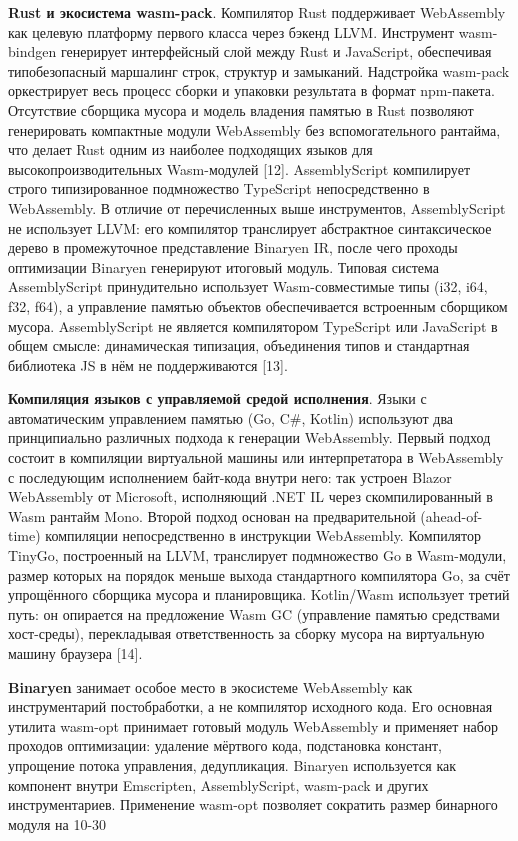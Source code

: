 \documentclass[12pt, oneside]{book}
\begin{document}
    \quad \textbf {Rust и экосистема wasm-pack}. Компилятор Rust поддерживает WebAssembly как целевую платформу первого класса через бэкенд LLVM. Инструмент wasm-bindgen генерирует интерфейсный слой между Rust и JavaScript, обеспечивая типобезопасный маршалинг строк, структур и замыканий. Надстройка wasm-pack оркестрирует весь процесс сборки и упаковки результата в формат npm-пакета. Отсутствие сборщика мусора и модель владения памятью в Rust позволяют генерировать компактные модули WebAssembly без вспомогательного рантайма, что делает Rust одним из наиболее подходящих языков для высокопроизводительных Wasm-модулей [12].
    AssemblyScript компилирует строго типизированное подмножество TypeScript непосредственно в WebAssembly. В отличие от перечисленных выше инструментов, AssemblyScript не использует LLVM: его компилятор транслирует абстрактное синтаксическое дерево в промежуточное представление Binaryen IR, после чего проходы оптимизации Binaryen генерируют итоговый модуль. Типовая система AssemblyScript принудительно использует Wasm-совместимые типы (i32, i64, f32, f64), а управление памятью объектов обеспечивается встроенным сборщиком мусора. AssemblyScript не является компилятором TypeScript или JavaScript в общем смысле: динамическая типизация, объединения типов и стандартная библиотека JS в нём не поддерживаются [13].
    
    \quad \textbf{Компиляция языков с управляемой средой исполнения}. Языки с автоматическим управлением памятью (Go, C\#, Kotlin) используют два принципиально различных подхода к генерации WebAssembly. Первый подход состоит в компиляции виртуальной машины или интерпретатора в WebAssembly с последующим исполнением байт-кода внутри него: так устроен Blazor WebAssembly от Microsoft, исполняющий .NET IL через скомпилированный в Wasm рантайм Mono. Второй подход основан на предварительной (ahead-of-time) компиляции непосредственно в инструкции WebAssembly. Компилятор TinyGo, построенный на LLVM, транслирует подмножество Go в Wasm-модули, размер которых на порядок меньше выхода стандартного компилятора Go, за счёт упрощённого сборщика мусора и планировщика. Kotlin/Wasm использует третий путь: он опирается на предложение Wasm GC (управление памятью средствами хост-среды), перекладывая ответственность за сборку мусора на виртуальную машину браузера [14].
    
    \quad \textbf{Binaryen} занимает особое место в экосистеме WebAssembly как инструментарий постобработки, а не компилятор исходного кода. Его основная утилита wasm-opt принимает готовый модуль WebAssembly и применяет набор проходов оптимизации: удаление мёртвого кода, подстановка констант, упрощение потока управления, дедупликация. Binaryen используется как компонент внутри Emscripten, AssemblyScript, wasm-pack и других инструментариев. Применение wasm-opt позволяет сократить размер бинарного модуля на 10-30%
    
\end{document}
